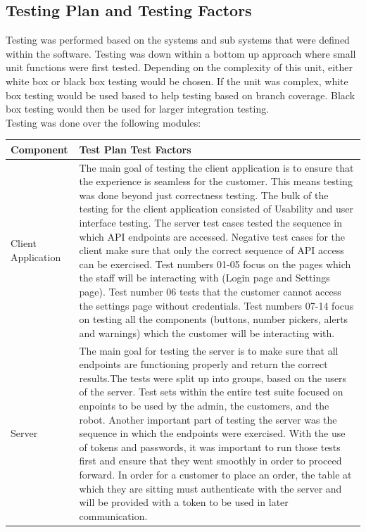 \documentclass [10pt]{article}
\begin{document}
\subsection{Testing Plan and Testing Factors}
Testing was performed based on the systems and sub systems that were defined within the software. Testing was down within a bottom up approach where small unit functions were first tested. Depending on the complexity of this unit, either white box or black box testing would be chosen. If the unit was complex, white box testing would be used based to help testing based on branch coverage. Black box testing would then be used for larger integration testing. \\

Testing was done over the following modules:

	\begin{longtable}{| p{} | p{} |}\hline 
				\rowcolor{tableCell}\textbf{Component} & \textbf{Test Plan Test Factors} \\ \hline
		Client Application & The main goal of testing the client application is to ensure that the experience is seamless for the customer. This means testing was done beyond just correctness testing. The bulk of the testing for the client application consisted of Usability and user interface testing. The server test cases tested the sequence in which API endpoints are accessed. Negative test cases for the client make sure that only the correct sequence of API access can be exercised.  Test numbers 01-05 focus on the pages which the staff will be interacting with (Login page and Settings page). Test number 06 tests that the customer cannot access the settings page without credentials. Test numbers 07-14 focus on testing all the components (buttons, number pickers, alerts and warnings) which the customer will be interacting with. \\ \hline
		Server & The main goal for testing the server is to make sure that all endpoints are functioning properly and return the correct results.The tests were split up into groups, based on the users of the server. Test sets within the entire test suite focused on enpoints to be used by the admin, the customers, and the robot. Another important part of testing the server was the sequence in which the endpoints were exercised. With the use of tokens and passwords, it was important to run those tests first and ensure that they went smoothly in order to proceed forward. In order for a customer to place an order, the table at which they are sitting must authenticate with the server and will be provided with a token to be used in later communication. \\ \hline

\end{longtable}
\end{document}
